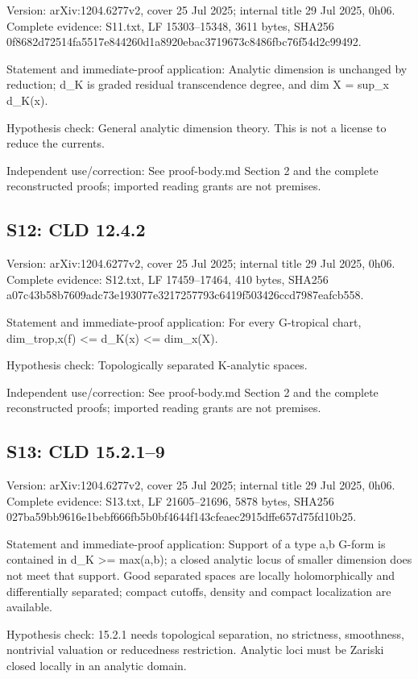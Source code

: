 \documentclass[11pt]{article}
\begin{document}
Version: arXiv:1204.6277v2, cover 25 Jul 2025; internal title 29 Jul 2025, 0h06. Complete evidence: S11.txt, LF 15303--15348, 3611 bytes, SHA256 0f8682d72514fa5517e844260d1a8920ebac3719673c8486fbc76f54d2c99492.

Statement and immediate-proof application: Analytic dimension is unchanged by reduction; d\_K is graded residual transcendence degree, and dim X = sup\_x d\_K(x).

Hypothesis check: General analytic dimension theory. This is not a license to reduce the currents.

Independent use/correction: See proof-body.md Section 2 and the complete reconstructed proofs; imported reading grants are not premises.

\subsection{S12: CLD 12.4.2}

Version: arXiv:1204.6277v2, cover 25 Jul 2025; internal title 29 Jul 2025, 0h06. Complete evidence: S12.txt, LF 17459--17464, 410 bytes, SHA256 a07c43b58b7609adc73e193077e3217257793c6419f503426ccd7987eafcb558.

Statement and immediate-proof application: For every G-tropical chart, dim\_trop,x(f) <= d\_K(x) <= dim\_x(X).

Hypothesis check: Topologically separated K-analytic spaces.

Independent use/correction: See proof-body.md Section 2 and the complete reconstructed proofs; imported reading grants are not premises.

\subsection{S13: CLD 15.2.1--9}

Version: arXiv:1204.6277v2, cover 25 Jul 2025; internal title 29 Jul 2025, 0h06. Complete evidence: S13.txt, LF 21605--21696, 5878 bytes, SHA256 027ba59bb9616e1bebf666fb5b0bf4644f143cfeaec2915dffe657d75fd10b25.

Statement and immediate-proof application: Support of a type a,b G-form is contained in d\_K >= max(a,b); a closed analytic locus of smaller dimension does not meet that support. Good separated spaces are locally holomorphically and differentially separated; compact cutoffs, density and compact localization are available.

Hypothesis check: 15.2.1 needs topological separation, no strictness, smoothness, nontrivial valuation or reducedness restriction. Analytic loci must be Zariski closed locally in an analytic domain.
\end{document}
